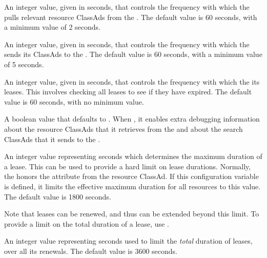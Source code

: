 \begin{description}

\label{param:LeaseManager.GetAdsInterval}
\item[\Macro{LeaseManager.GETADS\_INTERVAL}]
  An integer value, given in seconds, that controls the frequency
  with which the 
  pulls relevant resource ClassAds from the .
  The default value is 60 seconds, with a minimum value of 2 seconds.


\label{param:LeaseManager.UpdateInterval}
\item[\Macro{LeaseManager.UPDATE\_INTERVAL}]
  An integer value, given in seconds, that controls the frequency
  with which the 
  sends its ClassAds to the .
  The default value is 60 seconds, with a minimum value of 5 seconds.

\label{param:LeaseManager.PruneInterval}
\item[\Macro{LeaseManager.PRUNE\_INTERVAL}]
  An integer value, given in seconds, that controls the frequency
  with which the   its leases.
  This involves checking all leases to see if they have expired.
  The default value is 60 seconds, with no minimum value.

\label{param:LeaseManager.DebugAds}
\item[\Macro{LeaseManager.DEBUG\_ADS}]
  A boolean value that defaults to .
  When , it enables extra
  debugging information about the resource ClassAds that it retrieves
  from the  and about the search ClassAds that it sends
  to the .

\label{param:LeaseManager.MaxLeaseDuration}
\item[\Macro{LeaseManager.MAX\_LEASE\_DURATION}]
  An integer value representing seconds which determines 
  the maximum duration of a lease.  This can
  be used to provide a hard limit on lease durations.  Normally, the
   honors the  attribute
  from the resource ClassAd.  If this configuration variable is defined,
  it limits the effective maximum duration for all resources to this value.
  The default value is 1800 seconds.

  Note that leases can be renewed, and thus can be extended beyond this
  limit.  To provide a limit on the total duration of a lease, use 
  .

\label{param:LeaseManager.MaxTotalLeaseDuration}
\item[\Macro{LeaseManager.MAX\_TOTAL\_LEASE\_DURATION}]
  An integer value representing seconds used to limit
  the \emph{total} duration of leases, over
  all its renewals.  
  The default value is 3600 seconds.


\end{description}
